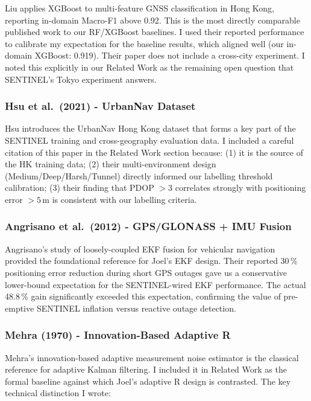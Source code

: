 \documentclass[12pt,a4paper]{article}
\begin{document}
Liu applies XGBoost to multi-feature GNSS classification in Hong Kong, reporting
in-domain Macro-F1 above 0.92.
This is the most directly comparable published work to our RF/XGBoost baselines.
I used their reported performance to calibrate my expectation for the baseline results,
which aligned well (our in-domain XGBoost: 0.919).
Their paper does not include a cross-city experiment.
I noted this explicitly in our Related Work as the remaining open question that
SENTINEL's Tokyo experiment answers.

\subsubsection{Hsu et al.\ (2021) - UrbanNav Dataset \cite{hsu2021urbannav}}

Hsu introduces the UrbanNav Hong Kong dataset that forms a key part of the SENTINEL
training and cross-geography evaluation data.
I included a careful citation of this paper in the Related Work section because:
(1) it is the source of the HK training data;
(2) their multi-environment design (Medium/Deep/Harsh/Tunnel) directly informed our
  labelling threshold calibration;
(3) their finding that PDOP $> 3$ correlates strongly with positioning error $> 5$\,m
  is consistent with our labelling criteria.

\subsubsection{Angrisano et al.\ (2012) - GPS/GLONASS + IMU Fusion \cite{angrisano2013imu}}

Angrisano's study of loosely-coupled EKF fusion for vehicular navigation provided the
foundational reference for Joel's EKF design.
Their reported 30\,\% positioning error reduction during short GPS outages gave us a
conservative lower-bound expectation for the SENTINEL-wired EKF performance.
The actual 48.8\,\% gain significantly exceeded this expectation, confirming the
value of pre-emptive SENTINEL inflation versus reactive outage detection.

\subsubsection{Mehra (1970) - Innovation-Based Adaptive R \cite{mehra1970}}

Mehra's innovation-based adaptive measurement noise estimator is the classical reference
for adaptive Kalman filtering.
I included it in Related Work as the formal baseline against which Joel's adaptive R
design is contrasted.
The key technical distinction I wrote:
\end{document}
